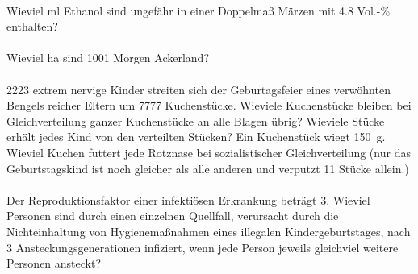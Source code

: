 \documentclass[paper=A4, pagesize, DIV=calc, smallheadings,
fontsize=12pt, expansion=false]{scrreprt}
\begin{document}
\paragraph{}
Wieviel ml Ethanol sind ungefähr in einer Doppelmaß Märzen mit \num{4.8} Vol.-\%  enthalten?

\paragraph{}
Wieviel ha sind 1001 Morgen Ackerland?

\paragraph{}
2223 extrem nervige Kinder streiten sich der Geburtagsfeier eines verwöhnten Bengels reicher Eltern um 7777 
Kuchenstücke. 
Wieviele Kuchenstücke bleiben bei Gleichverteilung ganzer Kuchenstücke an alle Blagen übrig? 
Wieviele Stücke erhält jedes Kind von den verteilten Stücken? Ein Kuchenstück wiegt \SI{150}{g}. Wieviel Kuchen futtert 
jede Rotznase bei 
sozialistischer Gleichverteilung (nur das Geburtstagskind ist noch gleicher als alle anderen und verputzt 11 Stücke 
allein.)

\paragraph{}
Der Reproduktionsfaktor einer infektiösen Erkrankung beträgt 3. Wieviel Personen sind durch einen einzelnen Quellfall,
verursacht durch die Nichteinhaltung von Hygienemaßnahmen eines illegalen Kindergeburtstages, 
nach 3 Ansteckungsgenerationen infiziert, wenn jede Person jeweils gleichviel weitere Personen ansteckt?
\end{document}

